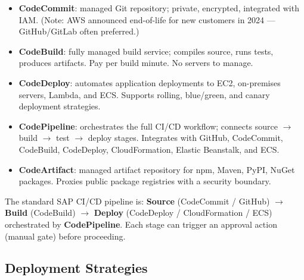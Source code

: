 

\begin{keyfacts}
\begin{itemize}
  \item \textbf{CodeCommit}: managed Git repository; private, encrypted, integrated with IAM.
        (Note: AWS announced end-of-life for new customers in 2024 --- GitHub/GitLab often preferred.)
  \item \textbf{CodeBuild}: fully managed build service; compiles source, runs tests, produces artifacts.
        Pay per build minute. No servers to manage.
  \item \textbf{CodeDeploy}: automates application deployments to EC2, on-premises servers, Lambda,
        and ECS. Supports rolling, blue/green, and canary deployment strategies.
  \item \textbf{CodePipeline}: orchestrates the full CI/CD workflow; connects source $\rightarrow$
        build $\rightarrow$ test $\rightarrow$ deploy stages. Integrates with GitHub, CodeCommit,
        CodeBuild, CodeDeploy, CloudFormation, Elastic Beanstalk, and ECS.
  \item \textbf{CodeArtifact}: managed artifact repository for npm, Maven, PyPI, NuGet packages.
        Proxies public package registries with a security boundary.
\end{itemize}
\end{keyfacts}

\begin{examtip}
The standard SAP CI/CD pipeline is: \textbf{Source} (CodeCommit / GitHub)
$\rightarrow$ \textbf{Build} (CodeBuild)
$\rightarrow$ \textbf{Deploy} (CodeDeploy / CloudFormation / ECS)
orchestrated by \textbf{CodePipeline}.
Each stage can trigger an approval action (manual gate) before proceeding.
\end{examtip}

\subsection{Deployment Strategies}

